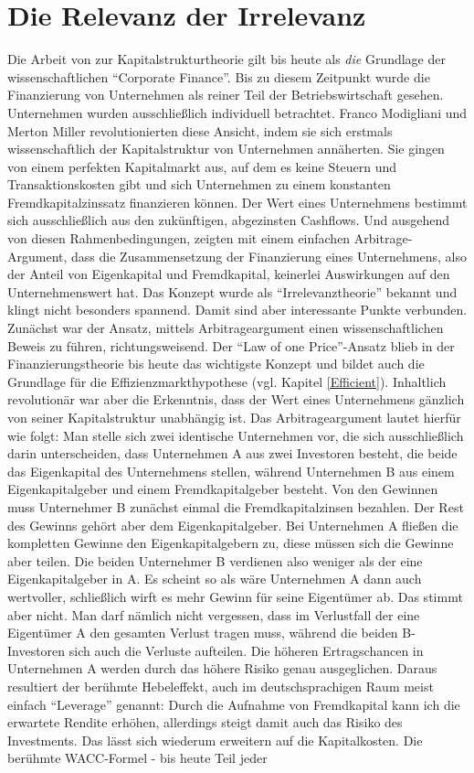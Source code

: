 \section{Die Relevanz der Irrelevanz}
\label{Struktur}
Die Arbeit von \textcite{Modigliani1958} zur Kapitalstrukturtheorie gilt bis heute als \textit{die} Grundlage der wissenschaftlichen "`Corporate Finance"'. Bis zu diesem Zeitpunkt wurde die Finanzierung von Unternehmen als reiner Teil der Betriebswirtschaft gesehen. Unternehmen wurden ausschließlich individuell betrachtet. Franco Modigliani und Merton Miller revolutionierten diese Ansicht, indem sie sich erstmals wissenschaftlich der Kapitalstruktur von Unternehmen annäherten. Sie gingen von einem perfekten Kapitalmarkt aus, auf dem es keine Steuern und Transaktionskosten gibt und sich Unternehmen zu einem konstanten Fremdkapitalzinssatz finanzieren können. Der Wert eines Unternehmens bestimmt sich ausschließlich aus den zukünftigen, abgezinsten Cashflows. Und ausgehend von diesen Rahmenbedingungen, zeigten \textcite{Modigliani1958} mit einem einfachen Arbitrage-Argument, dass die Zusammensetzung der Finanzierung eines Unternehmens, also der Anteil von Eigenkapital und Fremdkapital, keinerlei Auswirkungen auf den Unternehmenswert hat. Das Konzept wurde als "`Irrelevanztheorie"' bekannt und klingt nicht besonders spannend. Damit sind aber interessante Punkte verbunden. Zunächst war der Ansatz, mittels Arbitrageargument einen wissenschaftlichen Beweis zu führen, richtungsweisend. Der "`Law of one Price"'-Ansatz blieb in der Finanzierungstheorie bis heute das wichtigste Konzept und bildet auch die Grundlage für die Effizienzmarkthypothese (vgl. Kapitel \ref{Efficient}). Inhaltlich revolutionär war aber die Erkenntnis, dass der Wert eines Unternehmens gänzlich von seiner Kapitalstruktur unabhängig ist. Das Arbitrageargument lautet hierfür wie folgt: Man stelle sich zwei identische Unternehmen vor, die sich ausschließlich darin unterscheiden, dass Unternehmen A aus zwei Investoren besteht, die beide das Eigenkapital des Unternehmens stellen, während Unternehmen B aus einem Eigenkapitalgeber und einem Fremdkapitalgeber besteht. Von den Gewinnen muss Unternehmer B zunächst einmal die Fremdkapitalzinsen bezahlen. Der Rest des Gewinns gehört aber dem Eigenkapitalgeber. Bei Unternehmen A fließen die kompletten Gewinne den Eigenkapitalgebern zu, diese müssen sich die Gewinne aber teilen. Die beiden Unternehmer B verdienen also weniger als der eine Eigenkapitalgeber in A. Es scheint so als wäre Unternehmen A dann auch wertvoller, schließlich wirft es mehr Gewinn für seine Eigentümer ab. Das stimmt aber nicht. Man darf nämlich nicht vergessen, dass im Verlustfall der eine Eigentümer A den gesamten Verlust tragen muss, während die beiden B-Investoren sich auch die Verluste aufteilen. Die höheren Ertragschancen in Unternehmen A werden durch das höhere Risiko genau ausgeglichen. Daraus resultiert der berühmte Hebeleffekt, auch im deutschsprachigen Raum meist einfach "`Leverage"' genannt: Durch die Aufnahme von Fremdkapital kann ich die erwartete Rendite erhöhen, allerdings steigt damit auch das Risiko des Investments. Das lässt sich wiederum erweitern auf die Kapitalkosten. Die berühmte WACC-Formel - bis heute Teil jeder 